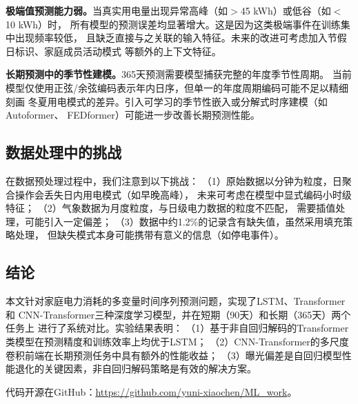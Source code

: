\documentclass[12pt,a4paper]{ctexart}
\begin{document}
\textbf{极端值预测能力弱。}当真实用电量出现异常高峰（如$>$45 kWh）或低谷（如$<$10 kWh）时，
所有模型的预测误差均显著增大。这是因为这类极端事件在训练集中出现频率较低，
且缺乏直接与之关联的输入特征。未来的改进可考虑加入节假日标识、家庭成员活动模式
等额外的上下文特征。

\textbf{长期预测中的季节性建模。}365天预测需要模型捕获完整的年度季节性周期。
当前模型仅使用正弦/余弦编码表示年内日序，但单一的年度周期编码可能不足以精细刻画
冬夏用电模式的差异。引入可学习的季节性嵌入或分解式时序建模（如Autoformer、
FEDformer）可能进一步改善长期预测性能。

\subsection{数据处理中的挑战}

在数据预处理过程中，我们注意到以下挑战：
（1）原始数据以分钟为粒度，日聚合操作会丢失日内用电模式（如早晚高峰），
未来可考虑在模型中显式编码小时级特征；
（2）气象数据为月度粒度，与日级电力数据的粒度不匹配，
需要插值处理，可能引入一定偏差；
（3）数据中约1.2\%的记录含有缺失值，虽然采用填充策略处理，
但缺失模式本身可能携带有意义的信息（如停电事件）。

\subsection{结论}

本文针对家庭电力消耗的多变量时间序列预测问题，实现了LSTM、Transformer和
CNN-Transformer三种深度学习模型，并在短期（90天）和长期（365天）两个任务上
进行了系统对比。实验结果表明：
（1）基于非自回归解码的Transformer类模型在预测精度和训练效率上均优于LSTM；
（2）CNN-Transformer的多尺度卷积前端在长期预测任务中具有额外的性能收益；
（3）曝光偏差是自回归模型性能退化的关键因素，非自回归解码策略是有效的解决方案。

代码开源在GitHub：\url{https://github.com/yuni-xiaochen/ML\_work}。

\end{document}
